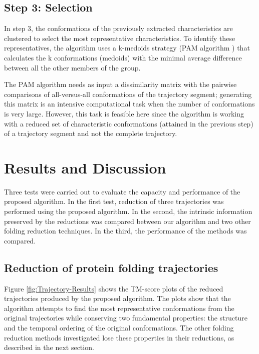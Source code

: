 \documentclass[twocolumn]{bmcart}%
\begin{document}
\subsection*{Step 3: Selection}

In step 3, the conformations of the previously extracted characteristics are clustered to select the most representative characteristics. To identify these representatives, the algorithm uses a k-medoids strategy (PAM algorithm \cite{Kaufman1990}) that calculates the k conformations (medoids) with the minimal average difference between all the other members of the group.

The PAM algorithm needs as input a dissimilarity matrix with the pairwise comparisons of all-versus-all conformations of the trajectory segment; generating this matrix is an intensive computational task when the number of conformations is very large. However, this task is feasible here since the algorithm is working with a reduced set of characteristic conformations (attained in the previous step) of a trajectory segment and not the complete trajectory.


\section*{Results and Discussion}

Three tests were carried out to evaluate the capacity and performance of the proposed algorithm. In the first test, reduction of three trajectories was performed using the proposed algorithm. In the second, the intrinsic information preserved by the reductions was compared between our algorithm and two other folding reduction techniques. In the third, the performance of the methods was compared.

\subsection*{Reduction of protein folding trajectories}

Figure \ref{fig:Trajectory-Results} shows the TM-score plots of the reduced trajectories produced by the proposed algorithm. The plots show that the algorithm attempts to find the most representative conformations from the original trajectories while conserving two fundamental properties: the structure and the temporal ordering of the original conformations. The other folding reduction methods investigated lose these properties in their reductions, as described in the next section.
\end{document}
